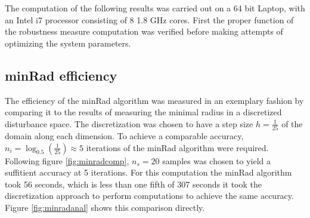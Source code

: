     The computation of the following results was carried out on a 64 bit Laptop, with an Intel i7 processor consisting of 8 1.8 GHz cores. 
    First the proper function of the robustness measure computation was verified before making attempts of optimizing the system parameters.   

    
    \subsection{minRad efficiency}

    The efficiency of the minRad algorithm was measured in an exemplary fashion by comparing it to the results of measuring the minimal radius in a discretized disturbance space. The discretization was chosen to have a step size $h =\frac{1}{25}$ of the domain along each dimension. To achieve a comparable accuracy, $n_{i} = \log_{0.5}(\frac{1}{25}) \approx 5$ iterations of the minRad algorithm were required. Following figure \ref{fig:minradcomp}, $n_s = 20$ samples was chosen to yield a suffitient accuracy at 5 iterations. For this computation the minRad algorithm took 56 seconds, which is less than one fifth of 307 seconds it took the discretization approach to perform computations to achieve the same accuracy. Figure \ref{fig:minradanal} shows this comparison directly. 

